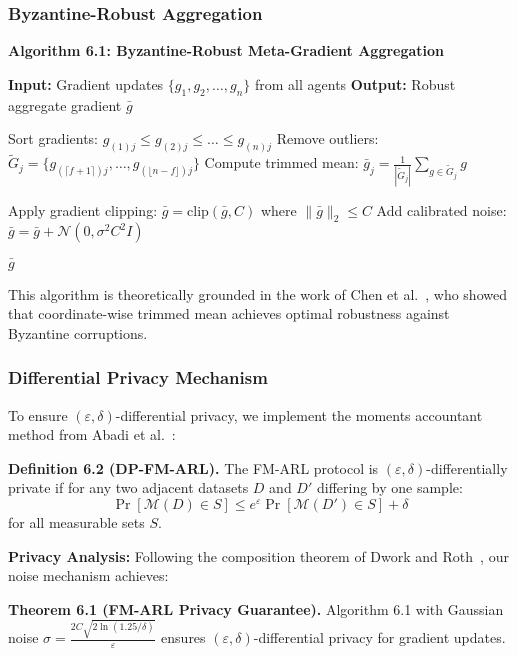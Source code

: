 \documentclass[conference]{IEEEtran}
\newcommand{\epsilon}{\varepsilon}
\begin{document}
\subsubsection{Byzantine-Robust Aggregation}

\textbf{Algorithm 6.1: Byzantine-Robust Meta-Gradient Aggregation}

\begin{algorithmic}[1]
\STATE \textbf{Input:} Gradient updates $\{g_1, g_2, \ldots, g_n\}$ from all agents
\STATE \textbf{Output:} Robust aggregate gradient $\bar{g}$

    \STATE Sort gradients: $g_{(1)j} \leq g_{(2)j} \leq \ldots \leq g_{(n)j}$
    \STATE Remove outliers: $\tilde{G}_j = \{g_{(\lceil f+1 \rceil)j}, \ldots, g_{(\lfloor n-f \rfloor)j}\}$
    \STATE Compute trimmed mean: $\bar{g}_j = \frac{1}{|\tilde{G}_j|} \sum_{g \in \tilde{G}_j} g$
\ENDFOR

\STATE Apply gradient clipping: $\bar{g} = \text{clip}(\bar{g}, C)$ where $\|\bar{g}\|_2 \leq C$
\STATE Add calibrated noise: $\bar{g} = \bar{g} + \mathcal{N}(0, \sigma^2 C^2 I)$

\RETURN $\bar{g}$
\end{algorithmic}

This algorithm is theoretically grounded in the work of Chen et al.~\cite{chen2017distributed}, who showed that coordinate-wise trimmed mean achieves optimal robustness against Byzantine corruptions.

\subsubsection{Differential Privacy Mechanism}

To ensure $(\epsilon, \delta)$-differential privacy, we implement the moments accountant method from Abadi et al.~\cite{abadi2016deep}:

\textbf{Definition 6.2 (DP-FM-ARL).} The FM-ARL protocol is $(\epsilon, \delta)$-differentially private if for any two adjacent datasets $D$ and $D'$ differing by one sample:
\begin{equation}
\Pr[\mathcal{M}(D) \in S] \leq e^\epsilon \Pr[\mathcal{M}(D') \in S] + \delta
\end{equation}
for all measurable sets $S$.

\textbf{Privacy Analysis:} Following the composition theorem of Dwork and Roth~\cite{dwork2014algorithmic}, our noise mechanism achieves:

\textbf{Theorem 6.1 (FM-ARL Privacy Guarantee).} Algorithm 6.1 with Gaussian noise $\sigma = \frac{2C\sqrt{2\ln(1.25/\delta)}}{\epsilon}$ ensures $(\epsilon, \delta)$-differential privacy for gradient updates.
\end{document}
